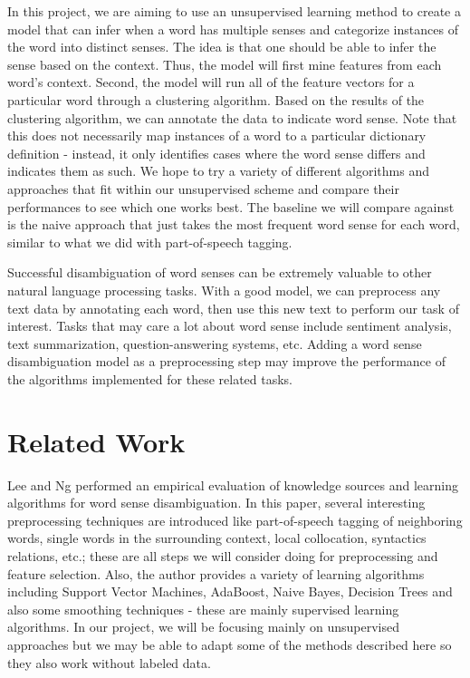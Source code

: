 \documentclass[11pt,letterpaper]{article}
\begin{document}
In this project, we are aiming to use an unsupervised learning method to create a model that can infer when a word has multiple senses and categorize instances of the word into distinct senses. The idea is that one should be able to infer the sense based on the context. Thus, the model will first mine features from each word's context. Second, the model will run all of the feature vectors for a particular word through a clustering algorithm. Based on the results of the clustering algorithm, we can annotate the data to indicate word sense. Note that this does not necessarily map instances of a word to a particular dictionary definition - instead, it only identifies cases where the word sense differs and indicates them as such. We hope to try a variety of different algorithms and approaches that fit within our unsupervised scheme and compare their performances to see which one works best. The baseline we will compare against is the naive approach that just takes the most frequent word sense for each word, similar to what we did with part-of-speech tagging. 

Successful disambiguation of word senses can be extremely valuable to other natural language processing tasks. With a good model, we can preprocess any text data by annotating each word, then use this new text to perform our task of interest. Tasks that may care a lot about word sense include sentiment analysis, text summarization, question-answering systems, etc. Adding a word sense disambiguation model as a preprocessing step may improve the performance of the algorithms implemented for these related tasks. 

\section{Related Work}
Lee and Ng  performed an empirical evaluation of knowledge sources and learning algorithms for word sense disambiguation. In this paper, several interesting preprocessing techniques are introduced like part-of-speech tagging of neighboring words, single words in the surrounding context, local collocation, syntactics relations, etc.; these are all steps we will consider doing for preprocessing and feature selection. Also, the author provides a variety of learning algorithms including Support Vector Machines, AdaBoost, Naive Bayes, Decision Trees and also some smoothing techniques - these are mainly supervised learning algorithms. In our project, we will be focusing mainly on unsupervised approaches but we may be able to adapt some of the methods described here so they also work without labeled data.
\end{document}
